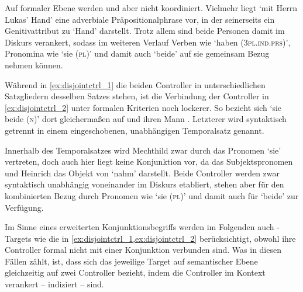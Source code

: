 Auf formaler Ebene werden  und  aber nicht koordiniert.
Vielmehr liegt  `mit Herrn Lukas' Hand' eine
adverbiale Präpositionalphrase vor, in der  seinerseits ein
Genitivattribut zu  `Hand' darstellt. Trotz allem sind beide
Personen damit im Diskurs verankert, sodass im weiteren Verlauf Verben wie
 `haben (\textsc{3pl.ind.prs})', Pronomina wie  `sie
(\textsc{pl})' und damit auch  `beide' auf sie gemeinsam Bezug nehmen
können.

Während in \cref{ex:disjointctrl_1} die beiden Controller in unterschiedlichen
Satzgliedern desselben Satzes stehen, ist die Verbindung der Controller in
\cref{ex:disjointctrl_2} unter formalen Kriterien noch lockerer. So bezieht sich
 `sie beide (\textsc{n})' dort gleichermaßen auf
 und ihren Mann . Letzterer wird
syntaktisch getrennt in einem eingeschobenen, unabhängigen Temporalsatz
genannt.


Innerhalb des Temporalsatzes wird Mechthild zwar durch das Pronomen 
`sie' vertreten, doch auch hier liegt keine Konjunktion vor, da 
das Subjektspronomen und Heinrich das Objekt von  `nahm'
darstellt. Beide Controller werden zwar syntaktisch unabhängig voneinander im
Diskurs etabliert, stehen aber für den kombinierten Bezug durch Pronomen wie
 `sie (\textsc{pl})' und damit auch für 
`beide' zur Verfügung.

Im Sinne eines erweiterten Konjunktionsbegriffs werden im Folgenden auch
-Targets wie die in \cref{ex:disjointctrl_1,ex:disjointctrl_2}
berücksichtigt, obwohl ihre Controller formal nicht mit einer Konjunktion
verbunden sind. Was in diesen Fällen zählt, ist, dass sich das jeweilige Target
auf semantischer Ebene gleichzeitig auf zwei Controller bezieht, indem die
Controller im Kontext verankert -- indiziert -- sind.
